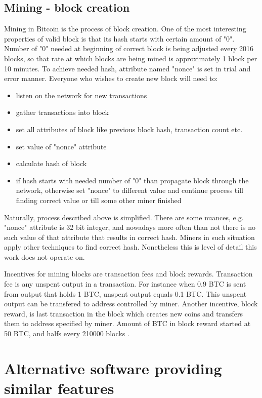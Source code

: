 \documentclass[12pt, en, eng, oneside, final]{mgr}
\begin{document}
\section{Mining - block creation}
Mining in Bitcoin is the process of block creation. One of the most interesting properties of valid block is that its hash starts with certain amount of "0". Number of "0" needed at beginning of correct block is being adjusted every 2016 blocks, so that rate at which blocks are being mined is approximately 1 block per 10 minutes. To achieve needed hash, attribute named "nonce" is set in trial and error manner. Everyone who wishes to create new block will need to:

\begin{itemize}
\item
listen on the network for new transactions
\item
gather transactions into block
\item
set all attributes of block like previous block hash, transaction count etc.
\item
set value of "nonce" attribute
\item
calculate hash of block
\item
if hash starts with needed number of "0" than propagate block through the network, otherwise set "nonce" to different value and continue process till finding correct value or till some other miner finished 
\end{itemize}

Naturally, process described above is simplified. There are some nuances, e.g. "nonce" attribute is 32 bit integer, and nowadays more often than not there is no such value of that attribute that results in correct hash. Miners in such situation apply other techniques to find correct hash. Nonetheless this is level of detail this work does not operate on.
 
Incentives for mining blocks are transaction fees and block rewards. Transaction fee is any unspent output in a transaction. For instance when 0.9 BTC is sent from output that holds 1 BTC, unspent output equals 0.1 BTC. This unspent output can be transfered to address controlled by miner.  
Another incentive, block reward, is last transaction in the block which creates new coins and transfers them to address specified by miner. Amount of BTC in block reward started at 50 BTC, and halfs every 210000 blocks \cite{currency-supply}.


\chapter{Alternative software providing similar features}
\end{document}

